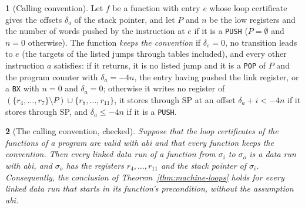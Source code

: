 \documentclass[oneside,english]{amsart}
\numberwithin{equation}{section}
\theoremstyle{plain}
\newtheorem{thm}{\protect\theoremname}
\theoremstyle{definition}
\newtheorem{defn}[thm]{\protect\definitionname}
\theoremstyle{plain}
\theoremstyle{plain}
\theoremstyle{remark}
\providecommand{\definitionname}{Definition}
\providecommand{\theoremname}{Theorem}
\begin{document}
\begin{defn}[Calling convention]
\label{def:convention}
Let $f$ be a function with entry $e$ whose loop certificate gives the offsets $\delta_a$ of the stack pointer, and let $P$ and $n$ be the low registers and the number of words pushed by the instruction at $e$ if it is a \texttt{PUSH} ($P = \emptyset$ and $n = 0$ otherwise). The function \emph{keeps the convention} if $\delta_e = 0$, no transition leads to $e$ (the targets of the listed jumps through tables included), and every other instruction $a$ satisfies: if it returns, it is no listed jump and it is a \texttt{POP} of $P$ and the program counter with $\delta_a = -4n$, the entry having pushed the link register, or a \texttt{BX} with $n = 0$ and $\delta_a = 0$; otherwise it writes no register of $(\{r_4, \dots, r_7\} \setminus P) \cup \{r_8, \dots, r_{11}\}$, it stores through SP at an offset $\delta_a + i < -4n$ if it stores through SP, and $\delta_a \le -4n$ if it is a \texttt{PUSH}.
\end{defn}

\begin{thm}[The calling convention, checked]
\label{thm:machine-conv}
Suppose that the loop certificates of the functions of a program are valid with \emph{abi} and that every function keeps the convention. Then every linked data run of a function from $\sigma_i$ to $\sigma_o$ is a data run with \emph{abi}, and $\sigma_o$ has the registers $r_4, \dots, r_{11}$ and the stack pointer of $\sigma_i$. Consequently, the conclusion of Theorem~\ref{thm:machine-loops} holds for every linked data run that starts in its function's precondition, without the assumption \emph{abi}.
\end{thm}
\end{document}
